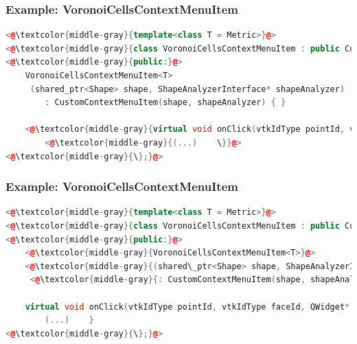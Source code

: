 \documentclass[compress]{beamer}
\begin{document}
\begin{frame}[fragile]
  \frametitle{Example: VoronoiCellsContextMenuItem}
  
\begin{lstlisting}[language=C++, numbers=none]
<@\textcolor{middle-gray}{template<class T = Metric>}@>
<@\textcolor{middle-gray}{class VoronoiCellsContextMenuItem : public CustomContextMenuItem \{}@>
<@\textcolor{middle-gray}{public:}@>
	VoronoiCellsContextMenuItem<T>
	 (shared_ptr<Shape> shape, ShapeAnalyzerInterface* shapeAnalyzer)
	 	: CustomContextMenuItem(shape, shapeAnalyzer) { }
    
    <@\textcolor{middle-gray}{virtual void onClick(vtkIdType pointId, vtkIdType faceId, QWidget* parent) \{}@>
        <@\textcolor{middle-gray}{(...)    \}}@>
<@\textcolor{middle-gray}{\};}@>
\end{lstlisting}
  
\end{frame}

\begin{frame}[fragile]
  \frametitle{Example: VoronoiCellsContextMenuItem}
  
\begin{lstlisting}[language=C++, numbers=none]
<@\textcolor{middle-gray}{template<class T = Metric>}@>
<@\textcolor{middle-gray}{class VoronoiCellsContextMenuItem : public CustomContextMenuItem \{}@>
<@\textcolor{middle-gray}{public:}@>
	<@\textcolor{middle-gray}{VoronoiCellsContextMenuItem<T>}@>
	<@\textcolor{middle-gray}{(shared\_ptr<Shape> shape, ShapeAnalyzerInterface* shapeAnalyzer)}@>
	 <@\textcolor{middle-gray}{: CustomContextMenuItem(shape, shapeAnalyzer) \{ \}}@>
    
    virtual void onClick(vtkIdType pointId, vtkIdType faceId, QWidget* parent) {
        (...)    }
<@\textcolor{middle-gray}{\};}@>
\end{lstlisting}
  
\end{frame}
\end{document}
